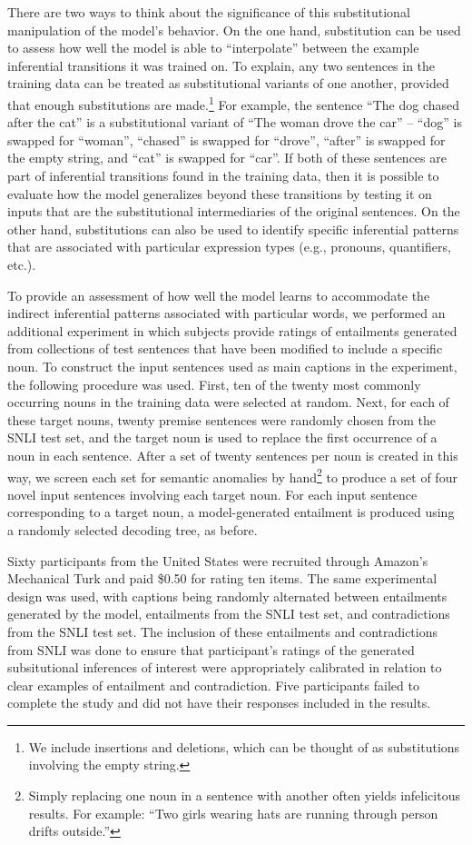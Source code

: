 \documentclass[utf8]{frontiersSCNS} %
\begin{document}
There are two ways to think about the significance of this substitutional manipulation of the model's behavior. On the one hand, substitution can be used to assess how well the model is able to ``interpolate'' between the example inferential transitions it was trained on. To explain, any two sentences in the training data can be treated as substitutional variants of one another, provided that enough substitutions are made.\footnote{We include insertions and deletions, which can be thought of as substitutions involving the empty string.} For example, the sentence ``The dog chased after the cat'' is a substitutional variant of ``The woman drove the car'' -- ``dog'' is swapped for ``woman'', ``chased'' is swapped for ``drove'', ``after'' is swapped for the empty string, and ``cat'' is swapped for ``car''. If both of these sentences are part of inferential transitions found in the training data, then it is possible to evaluate how the model generalizes beyond these transitions by testing it on inputs that are the substitutional intermediaries of the original sentences. On the other hand, substitutions can also be used to identify specific inferential patterns that are associated with particular expression types (e.g., pronouns, quantifiers, etc.).

To provide an assessment of how well the model learns to accommodate the indirect inferential patterns associated with particular words, we performed an additional experiment in which subjects provide ratings of entailments generated from collections of test sentences that have been modified to include a specific noun. To construct the input sentences used as main captions in the experiment, the following procedure was used. First, ten of the twenty most commonly occurring nouns in the training data were selected at random. Next, for each of these target nouns, twenty premise sentences were randomly chosen from the SNLI test set, and the target noun is used to replace the first occurrence of a noun in each sentence. After a set of twenty sentences per noun is created in this way, we screen each set for semantic anomalies by hand\footnote{Simply replacing one noun in a sentence with another often yields infelicitous results. For example: ``Two girls wearing hats are running through person drifts outside.''} to produce a set of four novel input sentences involving each target noun. For each input sentence corresponding to a target noun, a model-generated entailment is produced using a randomly selected decoding tree, as before. 

Sixty participants from the United States were recruited through Amazon's Mechanical Turk and paid \$0.50 for rating ten items. The same experimental design was used, with captions being randomly alternated between entailments generated by the model, entailments from the SNLI test set, and contradictions from the SNLI test set. The inclusion of these entailments and contradictions from SNLI was done to ensure that participant's ratings of the generated subsitutional inferences of interest were appropriately calibrated in relation to clear examples of entailment and contradiction. Five participants failed to complete the study and did not have their responses included in the results. 
\end{document}
